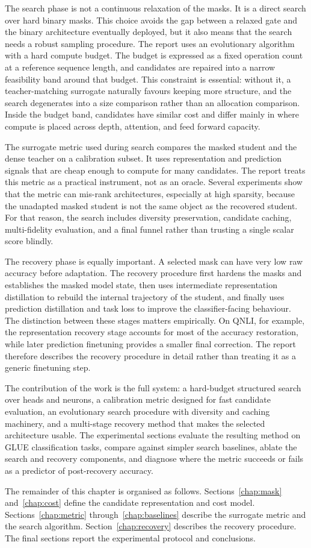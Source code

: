 The search phase is not a continuous relaxation of the masks. It is a direct search over hard binary masks. This choice avoids the gap between a relaxed gate and the binary architecture eventually deployed, but it also means that the search needs a robust sampling procedure. The report uses an evolutionary algorithm with a hard compute budget. The budget is expressed as a fixed operation count at a reference sequence length, and candidates are repaired into a narrow feasibility band around that budget. This constraint is essential: without it, a teacher-matching surrogate naturally favours keeping more structure, and the search degenerates into a size comparison rather than an allocation comparison. Inside the budget band, candidates have similar cost and differ mainly in where compute is placed across depth, attention, and feed forward capacity.

The surrogate metric used during search compares the masked student and the dense teacher on a calibration subset. It uses representation and prediction signals that are cheap enough to compute for many candidates. The report treats this metric as a practical instrument, not as an oracle. Several experiments show that the metric can mis-rank architectures, especially at high sparsity, because the unadapted masked student is not the same object as the recovered student. For that reason, the search includes diversity preservation, candidate caching, multi-fidelity evaluation, and a final funnel rather than trusting a single scalar score blindly.

The recovery phase is equally important. A selected mask can have very low raw accuracy before adaptation. The recovery procedure first hardens the masks and establishes the masked model state, then uses intermediate representation distillation to rebuild the internal trajectory of the student, and finally uses prediction distillation and task loss to improve the classifier-facing behaviour. The distinction between these stages matters empirically. On QNLI, for example, the representation recovery stage accounts for most of the accuracy restoration, while later prediction finetuning provides a smaller final correction. The report therefore describes the recovery procedure in detail rather than treating it as a generic finetuning step.

The contribution of the work is the full system: a hard-budget structured search over heads and neurons, a calibration metric designed for fast candidate evaluation, an evolutionary search procedure with diversity and caching machinery, and a multi-stage recovery method that makes the selected architecture usable. The experimental sections evaluate the resulting method on GLUE classification tasks, compare against simpler search baselines, ablate the search and recovery components, and diagnose where the metric succeeds or fails as a predictor of post-recovery accuracy.

The remainder of this chapter is organised as follows. Sections~\ref{chap:mask} and~\ref{chap:cost} define the candidate representation and cost model. Sections~\ref{chap:metric} through~\ref{chap:baselines} describe the surrogate metric and the search algorithm. Section~\ref{chap:recovery} describes the recovery procedure. The final sections report the experimental protocol and conclusions.
